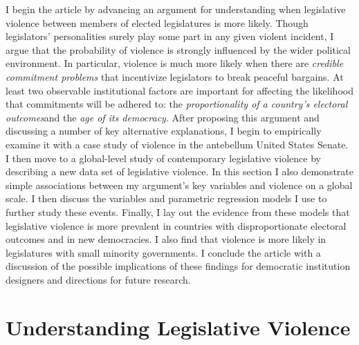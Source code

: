 \documentclass[a4paper]{article}\usepackage[]{graphicx}\usepackage[]{color}
\begin{document}
I begin the article by advancing an argument for understanding when legislative violence between members of  elected legislatures is more likely. Though legislators' personalities surely play some part in any given violent incident, I argue that the probability of violence is strongly influenced by the wider political environment. In particular, violence is much more likely when there are \emph{credible commitment problems} that incentivize legislators to break peaceful bargains. At least two observable institutional factors are important for affecting the likelihood that commitments will be adhered to: the \emph{proportionality of a country's electoral outcomes}and the \emph{age of its democracy}. After proposing this argument and discussing a number of key alternative explanations, I begin to empirically examine it with a case study of violence in the antebellum United States Senate.  I then move to  a global-level study of contemporary legislative violence by describing a new data set of legislative violence. In this section I also demonstrate simple associations between my argument's key variables and violence on a global scale. I then discuss the variables and parametric regression models I use to further study these events. Finally, I lay out the evidence from these models that legislative violence is more prevalent in countries with disproportionate electoral outcomes and in new democracies. I also find that violence is more likely in legislatures with small minority governments. I conclude the article with a discussion of the possible implications of these findings for democratic institution designers and directions for future research.


\section*{Understanding Legislative Violence}
\end{document}
